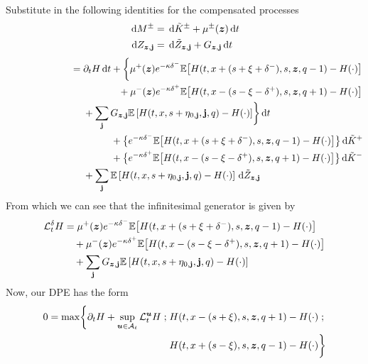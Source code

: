 Substitute in the following identities for the compensated processes
\begin{align} 
\,\mathrm{d} M^{\pm} & = \,\mathrm{d} \tilde{K}^{\pm} + \mu^{\pm}(\bm{z}) \,\mathrm{d}t \\
\,\mathrm{d} Z_{\bm{z},\mathbf{j}}  & = \,\mathrm{d} \tilde{Z}_{\bm{z},\mathbf{j}}  + G_{\bm{z},\mathbf{j}} \,\mathrm{d}t 
\end{align}
\begin{align}
\begin{split}
{}\phantom{\d H (t,x,s,\bz,q)} & = \partial_t H \dt + \biggl\lbrace \mu^+(\bz) e^{ -\kappa \delta^{-}} \E \bigl[ H(t,x+(s+\xi+\delta^-),s,\bz,q-1) - H(\cdot) \bigr] \\
& \hphantom{{}={} \partial_t H \dt +} + \mu^-(\bz) e^{ -\kappa \delta^{+}} \E \bigl[ H(t,x-(s-\xi-\delta^+),s,\bz,q+1) - H(\cdot) \bigr] \\
& \hphantom{{}={}} + \sum_{\bj} G_{\bz,\bj} \E \left[ H(t,x,s+\eta_{0,\bj},\bj,q) - H(\cdot) \right]  \biggr\rbrace \dt \\
& \hphantom{{}={} \partial_t H \dt} + \bigl\lbrace e^{ -\kappa \delta^{-}} \E \bigl[ H(t,x+(s+\xi+\delta^-),s,\bz,q-1) - H(\cdot) \bigr] \bigr\rbrace \d \tilde{K}^+\\
& \hphantom{{}={} \partial_t H \dt} + \bigl\lbrace e^{ -\kappa \delta^{+}} \E \bigl[ H(t,x-(s-\xi-\delta^+),s,\bz,q+1) - H(\cdot) \bigr] \bigr\rbrace \d \tilde{K}^-\\
& \hphantom{{}={}} + \sum_{\bj} \E \left[ H(t,x,s+\eta_{0,\bj},\bj,q) - H(\cdot) \right] \d \tilde{Z}_{\bz,\bj}
\end{split}
\end{align}
From which we can see that the infinitesimal generator is given by
\begin{equation}\label{eq:infgen}
\begin{split}
\mathcal{L}^{\delta}_t H & = \mu^+(\bm{z}) e^{ -\kappa \delta^{-}} \mathbb{E} \bigl[ H(t,x+(s+\xi+\delta^-),s,\bm{z},q-1) - H(\cdot) \bigr] \\
& \quad + \mu^-(\bm{z}) e^{ -\kappa \delta^{+}} \mathbb{E} \bigl[ H(t,x-(s-\xi-\delta^+),s,\bm{z},q+1) - H(\cdot) \bigr] \\
& \quad + \sum_{\mathbf{j}} G_{\bm{z},\mathbf{j}} \mathbb{E} \left[ H(t,x,s+\eta_{0,\mathbf{j}},\mathbf{j},q) - H(\cdot) \right]
\end{split}
\end{equation}
Now, our DPE has the form
\begin{equation}\label{eq:DPEmaxprofit}
\begin{split}
0 = \max \biggl\lbrace \partial_t H + \sup \limits_{\bm{u} \in \mathcal{A}_t} \mathcal{L}^{\bm{u}}_t H \; ; \; & H(t,x-(s+\xi), s, \bm{z}, q+1) - H(\cdot) \; ; \\
&  H(t,x+(s-\xi), s, \bm{z}, q-1) - H(\cdot) \biggr\rbrace
\end{split}
\end{equation}
